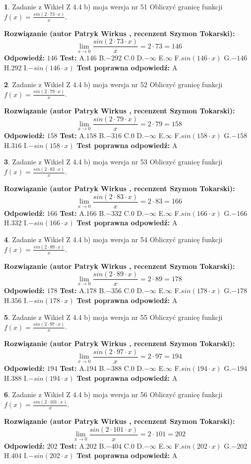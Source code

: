 \documentclass[12pt, a4paper]{article}
\theoremstyle{definition} %
\newtheorem{zad}{}
\newcommand{\zadStart}[1]{\begin{zad}#1\newline}
\newcommand{\zadStop}{\end{zad}}
\newcommand{\rozwStart}[2]{\noindent \textbf{Rozwiązanie (autor #1 , recenzent #2): }\newline}
\newcommand{\rozwStop}{\newline}
\newcommand{\odpStart}{\noindent \textbf{Odpowiedź:}\newline}
\newcommand{\odpStop}{\newline}
\newcommand{\testStart}{\noindent \textbf{Test:}\newline}
\newcommand{\testStop}{\newline}
\newcommand{\kluczStart}{\noindent \textbf{Test poprawna odpowiedź:}\newline}
\newcommand{\kluczStop}{\newline}
\begin{document}
\zadStart{Zadanie z Wikieł Z 4.4 b) moja wersja nr 51}
Obliczyć granicę funkcji $f(x)=\frac{sin(2 \cdot73\cdot x)}{x}$.
\zadStop
\rozwStart{Patryk Wirkus}{Szymon Tokarski}
$$\lim\limits_{x\to 0}\frac{sin(2 \cdot 73\cdot x)}{x}=
2 \cdot 73 = 146$$
\rozwStop
\odpStart
$146$
\odpStop
\testStart
A.$146$
B.$-292$
C.$0$
D.$-\infty$
E.$\infty$
F.$sin(146\cdot x)$
G.$-146$
H.$292$
I.$-sin(146\cdot x)$
\testStop
\kluczStart
A
\kluczStop



\zadStart{Zadanie z Wikieł Z 4.4 b) moja wersja nr 52}
Obliczyć granicę funkcji $f(x)=\frac{sin(2 \cdot79\cdot x)}{x}$.
\zadStop
\rozwStart{Patryk Wirkus}{Szymon Tokarski}
$$\lim\limits_{x\to 0}\frac{sin(2 \cdot 79\cdot x)}{x}=
2 \cdot 79 = 158$$
\rozwStop
\odpStart
$158$
\odpStop
\testStart
A.$158$
B.$-316$
C.$0$
D.$-\infty$
E.$\infty$
F.$sin(158\cdot x)$
G.$-158$
H.$316$
I.$-sin(158\cdot x)$
\testStop
\kluczStart
A
\kluczStop



\zadStart{Zadanie z Wikieł Z 4.4 b) moja wersja nr 53}
Obliczyć granicę funkcji $f(x)=\frac{sin(2 \cdot83\cdot x)}{x}$.
\zadStop
\rozwStart{Patryk Wirkus}{Szymon Tokarski}
$$\lim\limits_{x\to 0}\frac{sin(2 \cdot 83\cdot x)}{x}=
2 \cdot 83 = 166$$
\rozwStop
\odpStart
$166$
\odpStop
\testStart
A.$166$
B.$-332$
C.$0$
D.$-\infty$
E.$\infty$
F.$sin(166\cdot x)$
G.$-166$
H.$332$
I.$-sin(166\cdot x)$
\testStop
\kluczStart
A
\kluczStop



\zadStart{Zadanie z Wikieł Z 4.4 b) moja wersja nr 54}
Obliczyć granicę funkcji $f(x)=\frac{sin(2 \cdot89\cdot x)}{x}$.
\zadStop
\rozwStart{Patryk Wirkus}{Szymon Tokarski}
$$\lim\limits_{x\to 0}\frac{sin(2 \cdot 89\cdot x)}{x}=
2 \cdot 89 = 178$$
\rozwStop
\odpStart
$178$
\odpStop
\testStart
A.$178$
B.$-356$
C.$0$
D.$-\infty$
E.$\infty$
F.$sin(178\cdot x)$
G.$-178$
H.$356$
I.$-sin(178\cdot x)$
\testStop
\kluczStart
A
\kluczStop



\zadStart{Zadanie z Wikieł Z 4.4 b) moja wersja nr 55}
Obliczyć granicę funkcji $f(x)=\frac{sin(2 \cdot97\cdot x)}{x}$.
\zadStop
\rozwStart{Patryk Wirkus}{Szymon Tokarski}
$$\lim\limits_{x\to 0}\frac{sin(2 \cdot 97\cdot x)}{x}=
2 \cdot 97 = 194$$
\rozwStop
\odpStart
$194$
\odpStop
\testStart
A.$194$
B.$-388$
C.$0$
D.$-\infty$
E.$\infty$
F.$sin(194\cdot x)$
G.$-194$
H.$388$
I.$-sin(194\cdot x)$
\testStop
\kluczStart
A
\kluczStop



\zadStart{Zadanie z Wikieł Z 4.4 b) moja wersja nr 56}
Obliczyć granicę funkcji $f(x)=\frac{sin(2 \cdot101\cdot x)}{x}$.
\zadStop
\rozwStart{Patryk Wirkus}{Szymon Tokarski}
$$\lim\limits_{x\to 0}\frac{sin(2 \cdot 101\cdot x)}{x}=
2 \cdot 101 = 202$$
\rozwStop
\odpStart
$202$
\odpStop
\testStart
A.$202$
B.$-404$
C.$0$
D.$-\infty$
E.$\infty$
F.$sin(202\cdot x)$
G.$-202$
H.$404$
I.$-sin(202\cdot x)$
\testStop
\kluczStart
A
\kluczStop
\end{document}
